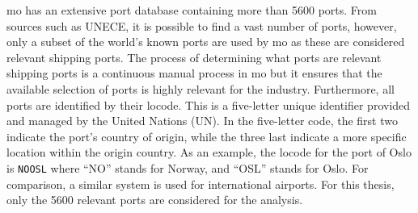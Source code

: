 \acrshort{mo} has an extensive port database containing more than 5600 ports. From sources such as UNECE, it is possible to find a vast number of ports, however, only a subset of the world's known ports are used by \acrshort{mo} as these are considered relevant shipping ports. The process of determining what ports are relevant shipping ports is a continuous manual process in \acrshort{mo} but it ensures that the available selection of ports is highly relevant for the industry. Furthermore, all ports are identified by their \gls{locode}. This is a five-letter unique identifier provided and managed by the United Nations (UN). In the five-letter code, the first two indicate the port's country of origin, while the three last indicate a more specific location within the origin country. As an example, the \gls{locode} for the port of Oslo is \texttt{NOOSL} where ``NO'' stands for Norway, and ``OSL'' stands for Oslo. For comparison, a similar system is used for international airports. For this thesis, only the 5600 relevant ports are considered for the analysis.
